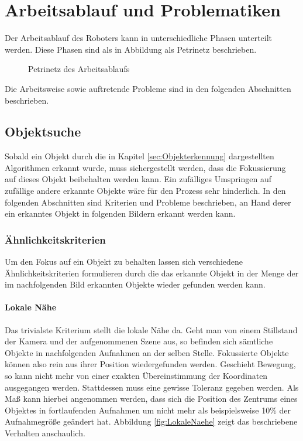 \chapter{Arbeitsablauf und Problematiken}

Der Arbeitsablauf des Roboters kann in unterschiedliche Phasen unterteilt werden. Diese Phasen sind als in Abbildung als Petrinetz beschrieben.

\begin{figure}[h]
\centering
\caption{Petrinetz des Arbeitsablaufs}
\label{fig:Petrinetz}
\end{figure}

Die Arbeitsweise sowie auftretende Probleme sind in den folgenden Abschnitten beschrieben.

\section{Objektsuche}


Sobald ein Objekt durch die in Kapitel \ref{sec:Objekterkennung} dargestellten Algorithmen erkannt wurde, muss sichergestellt werden, dass die Fokussierung auf dieses Objekt beibehalten werden kann. Ein zufälliges Umspringen auf zufällige andere erkannte Objekte wäre für den Prozess sehr hinderlich. In den folgenden Abschnitten sind Kriterien und Probleme beschrieben, an Hand derer ein erkanntes Objekt in folgenden Bildern erkannt werden kann.

\subsection{Ähnlichkeitskriterien}
\label{subsec:Similarity}
Um den Fokus auf ein Objekt zu behalten lassen sich verschiedene Ähnlichkeitskriterien formulieren durch die das erkannte Objekt in der Menge der im nachfolgenden Bild erkannten Objekte wieder gefunden werden kann.

\subsubsection{Lokale Nähe}
Das trivialste Kriterium stellt die lokale Nähe da. Geht man von einem Stillstand der Kamera und der aufgenommenen Szene aus, so befinden sich sämtliche Objekte in nachfolgenden Aufnahmen an der selben Stelle. Fokussierte Objekte können also rein aus ihrer Position wiedergefunden werden. Geschieht Bewegung, so kann nicht mehr von einer exakten Übereinstimmung der Koordinaten ausgegangen werden. Stattdessen muss eine gewisse Toleranz gegeben werden. Als Maß kann hierbei angenommen werden, dass sich die Position des Zentrums eines Objektes in fortlaufenden Aufnahmen um nicht mehr als beispielsweise 10\% der Aufnahmegröße geändert hat. Abbildung \ref{fig:LokaleNaehe} zeigt das beschriebene Verhalten anschaulich.


